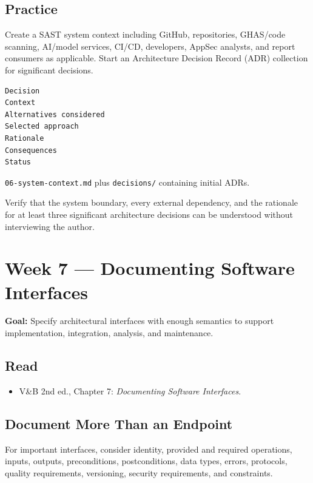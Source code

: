 \documentclass[10pt,letterpaper]{article}
\begin{document}
\subsection{Practice}
Create a SAST system context including GitHub, repositories, GHAS/code scanning, AI/model services, CI/CD, developers, AppSec analysts, and report consumers as applicable. Start an Architecture Decision Record (ADR) collection for significant decisions.

\begin{lstlisting}
Decision
Context
Alternatives considered
Selected approach
Rationale
Consequences
Status
\end{lstlisting}

\begin{deliverablebox}
\texttt{06-system-context.md} plus \texttt{decisions/} containing initial ADRs.
\end{deliverablebox}

\begin{masterybox}
Verify that the system boundary, every external dependency, and the rationale for at least three significant architecture decisions can be understood without interviewing the author.
\end{masterybox}

\section{Week 7 --- Documenting Software Interfaces}

\textbf{Goal:} Specify architectural interfaces with enough semantics to support implementation, integration, analysis, and maintenance.

\subsection{Read}
\begin{itemize}
  \item V\&B 2nd ed., Chapter 7: \emph{Documenting Software Interfaces}.
\end{itemize}

\subsection{Document More Than an Endpoint}
For important interfaces, consider identity, provided and required operations, inputs, outputs, preconditions, postconditions, data types, errors, protocols, quality requirements, versioning, security requirements, and constraints.
\end{document}

